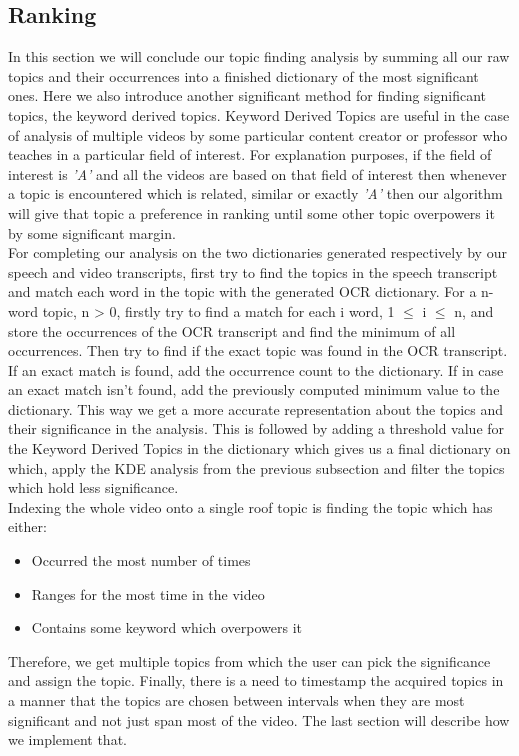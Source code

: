 \documentclass[conference]{IEEEtran}
\begin{document}
\subsection{Ranking}
In this section we will conclude our topic finding analysis by summing all our raw topics and their occurrences into a finished dictionary of the most significant ones. Here we also introduce another significant method for finding significant topics, the keyword derived topics.
	Keyword Derived Topics are useful in the case of analysis of multiple videos by some particular content creator or professor who teaches in a particular field of interest. For explanation purposes, if the field of interest is \textit{'A'} and all the videos are based on that field of interest then whenever a topic is encountered which is related, similar or exactly \textit{'A'} then our algorithm will give that topic a preference in ranking until some other topic overpowers it by some significant margin.\\
\indent For completing our analysis on the two dictionaries generated respectively by our speech and video transcripts, first try to find the topics in the speech transcript and match each word in the topic with the generated OCR dictionary. For a n-word topic, n > 0, firstly try to find a match for each i word, 1 $\leq$ i $\leq$ n, and store the occurrences of the OCR transcript and find the minimum of all occurrences. Then try to find if the exact topic was found in the OCR transcript. If an exact match is found, add the occurrence count to the dictionary. If in case an exact match isn’t found, add the previously computed minimum value to the dictionary. This way we get a more accurate representation about the topics and their significance in the analysis. This is followed by adding a threshold value for the Keyword Derived Topics in the dictionary which gives us a final dictionary on which, apply the KDE analysis from the previous subsection and filter the topics which hold less significance.\\
\indent Indexing the whole video onto a single roof topic is finding the topic which has either:
\begin{itemize}
\item Occurred the most number of times
\item Ranges for the most time in the video
\item Contains some keyword which overpowers it
\end{itemize}
\indent Therefore, we get multiple topics from which the user can pick the significance and assign the topic. Finally, there is a need to timestamp the acquired topics in a manner that the topics are chosen between intervals when they are most significant and not just span most of the video. The last section will describe how we implement that.
\end{document}
